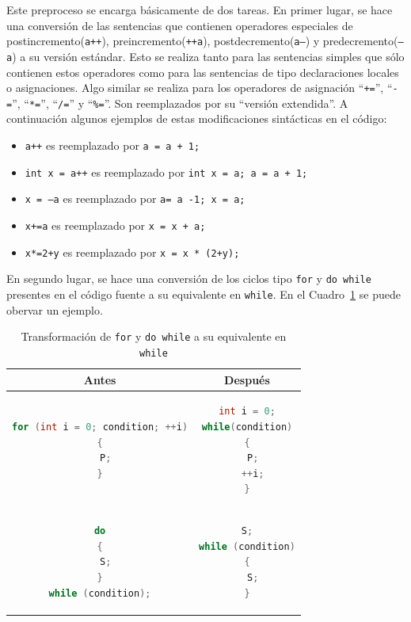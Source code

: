 \documentclass{llncs}
\begin{document}
Este preproceso se encarga básicamente de dos tareas. En primer lugar, se hace una conversión de las sentencias que contienen operadores especiales de postincremento(\texttt{a++}), preincremento(\texttt{++a}), postdecremento(\texttt{a--}) y predecremento(\texttt{--a}) a su versión estándar. Esto se realiza tanto para las sentencias simples que sólo contienen estos operadores como para las sentencias de tipo declaraciones locales o asignaciones. Algo similar se realiza para los operadores de asignación “\texttt{+=}”, “\texttt{-=}”, “\texttt{*=}”, “\texttt{/=}” y “\texttt{\%=}”. Son reemplazados por su “versión extendida”. A continuación algunos ejemplos de estas modificaciones sintácticas en el código:
\begin{itemize}
  \item \texttt{a++} es reemplazado por \texttt{a = a + 1;}
  \item \texttt{int x = a++} es reemplazado por \texttt{int x = a; a = a + 1;}
  \item \texttt{x = --a} es reemplazado por \texttt{a= a -1; x = a;}
  \item \texttt{x+=a} es reemplazado por \texttt{x = x + a;}
  \item \texttt{x*=2+y} es reemplazado por \texttt{x = x * (2+y);}
\end{itemize}
\noindent En segundo lugar, se hace una conversión de los ciclos tipo \texttt{for} y \texttt{do while} presentes en el código fuente a su equivalente en \texttt{while}. En el Cuadro~\ref{transfCiclos} se puede obervar un ejemplo.

\begin{table}
\centering
\begin{tabular}{|c | c|}
\hline
Antes & Después\\
\hline
\begin{lstlisting}[language=Java]
for (int i = 0; condition; ++i)
{
  P;
}
\end{lstlisting} & 
\begin{lstlisting}[language=Java]
int i = 0;
while(condition)
{
  P;
  ++i;
}
\end{lstlisting}\\
\hline
\begin{lstlisting}[language=Java]
do
{
  S;
}
while (condition);
\end{lstlisting} & 
\begin{lstlisting}[language=Java]
S;
while (condition)
{
  S;
}
\end{lstlisting}\\
\hline
\end{tabular}
\caption{Transformación de \texttt{for} y \texttt{do while} a su equivalente en \texttt{while}}
\label{transfCiclos}
\end{table}
\end{document}
